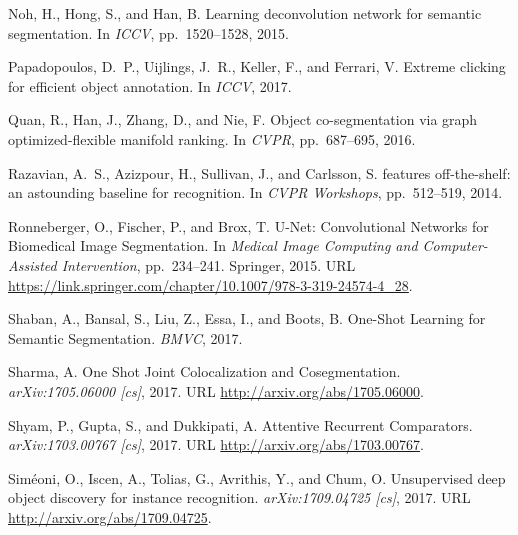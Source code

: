 \documentclass{article}
\begin{document}
\begin{thebibliography}{42}
Noh, H., Hong, S., and Han, B.
\newblock Learning deconvolution network for semantic segmentation.
\newblock In \emph{{ICCV}}, pp.\  1520--1528, 2015.

Papadopoulos, D.~P., Uijlings, J.~R., Keller, F., and Ferrari, V.
\newblock Extreme clicking for efficient object annotation.
\newblock In \emph{{ICCV}}, 2017.

Quan, R., Han, J., Zhang, D., and Nie, F.
\newblock Object co-segmentation via graph optimized-flexible manifold ranking.
\newblock In \emph{{CVPR}}, pp.\  687--695, 2016.

Razavian, A.~S., Azizpour, H., Sullivan, J., and Carlsson, S.
 features off-the-shelf: an astounding baseline for recognition.
\newblock In \emph{{CVPR} {Workshops}}, pp.\  512--519, 2014.

Ronneberger, O., Fischer, P., and Brox, T.
\newblock U-{Net}: {Convolutional} {Networks} for {Biomedical} {Image}
  {Segmentation}.
\newblock In \emph{Medical {Image} {Computing} and {Computer}-{Assisted}
  {Intervention}}, pp.\  234--241. Springer, 2015.
\newblock URL
  \url{https://link.springer.com/chapter/10.1007/978-3-319-24574-4_28}.

Shaban, A., Bansal, S., Liu, Z., Essa, I., and Boots, B.
\newblock One-{Shot} {Learning} for {Semantic} {Segmentation}.
\newblock \emph{{BMVC}}, 2017.

Sharma, A.
\newblock One {Shot} {Joint} {Colocalization} and {Cosegmentation}.
\newblock \emph{arXiv:1705.06000 [cs]}, 2017.
\newblock URL \url{http://arxiv.org/abs/1705.06000}.

Shyam, P., Gupta, S., and Dukkipati, A.
\newblock Attentive {Recurrent} {Comparators}.
\newblock \emph{arXiv:1703.00767 [cs]}, 2017.
\newblock URL \url{http://arxiv.org/abs/1703.00767}.

Sim{\'e}oni, O., Iscen, A., Tolias, G., Avrithis, Y., and Chum, O.
\newblock Unsupervised deep object discovery for instance recognition.
\newblock \emph{arXiv:1709.04725 [cs]}, 2017.
\newblock URL \url{http://arxiv.org/abs/1709.04725}.


\end{thebibliography}
\end{document}
